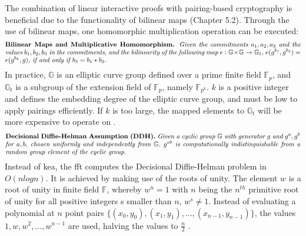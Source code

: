 The combination of linear interactive proofs with pairing-based cryptography is beneficial due to the functionality of bilinear maps (Chapter 5.2). Through the use of bilinear maps, one homomorphic multiplication operation can be executed:
\begin{align*}
    \text{\parbox{450pt}{\textbf{Bilinear Maps and Multiplicative Homomorphism.} \textit{Given the commitments \(a_1, a_2, a_3\) and the values \(b_1, b_2, b_3\) in the commitments, and the bilinearity of the following map \begin{math}
        e: \mathbb{G} \times \mathbb{G} \to \mathbb{G}_t
    \end{math}, \(e(g^{b_1}, g^{b_2}) = e(g^{b_3}, g)\), if and only if \(b_3 = b_1 * b_2\).}}}
\end{align*}
In practice, \begin{math} \mathbb{G} \end{math} is an elliptic curve group defined over a prime finite field \begin{math} \mathbb{F}_p \end{math}, and \begin{math} \mathbb{G}_t \end{math} is a subgroup of the extension field of \begin{math} \mathbb{F}_p \end{math}, namely \begin{math} \mathbb{F}_{p^k} \end{math}. \(k\) is a positive integer and defines the embedding degree of the elliptic curve group, and must be low to apply pairings efficiently. If \(k\) is too large, the mapped elements to \begin{math} \mathbb{G}_t \end{math} will be more expensive to operate on \citep{Thaler}.
\begin{align*}
    \text{\parbox{450pt}{\textbf{Decisional Diffie-Helman Assumption (DDH).} \textit{Given a cyclic group \begin{math}\mathbb{G}\end{math} with generator \(g\) and \(g^a, g^b\) for \(a, b\), chosen uniformly and independently from \begin{math}\mathbb{G}\end{math}, \(g^{ab}\) is computationally indistinguishable from a random group element of the cyclic group.}}}
\end{align*}
Instead of \acrshort{kea}, the \acrshort{fft} computes the Decisional Diffie-Helman problem in \(O(nlogn)\). It is achieved by making use of the roots of unity. The element \(w\) is a root of unity in finite field \begin{math} \mathbb{F}\end{math}, whereby \(w^n = 1\) with \(n\) being the \(n^{th}\) primitive root of unity for all positive integers s smaller than \(n\), \(w^s \neq 1 \). Instead of evaluating a polynomial at \(n\) point pairs \(\{(x_0,y_0), (x_1,y_1), ..., (x_{n-1}, y_{n-1})\}\), the values \(1, w, w^2, ..., w^{n-1}\) are used, halving the values to \(\frac{n}{2}\) \citep{Groth2016OnTS}.

